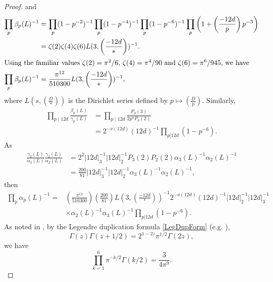 \documentclass[12pt, a4paper]{article}
\begin{document}
\begin{proof}
  and
  \begin{align*}
    \prod_p \beta_p(L)^{-1} & =
    \prod_p (1-p^{-2})^{-1} \prod_p (1 - p^{-4})^{-1} \prod_p (1-p^{-6})^{-1} \prod_p \left( 1 + \left ( \frac{-12d}{p} \right )p^{-3} \right) \\
& = \zeta(2) \zeta(4) \zeta(6) L(3, \left (\frac{-12d}{*} \right ))^{-1}.\\
\intertext{Using the familiar values $\zeta(2) = \pi^2/6$, $\zeta(4) = \pi^4 / 90$ and $\zeta(6) = \pi^6/945$, we have }
    \prod_p \beta_p(L)^{-1} & = \frac{\pi^{12}}{510300} L(3, \left ( \frac{-12d}{*} \right ) )^{-1},
  \end{align*}
  where $L(s, \left( \frac{D}{*} \right) )$ is the Dirichlet series defined by $p \mapsto \left( \frac{D}{p} \right )$. 
  Similarly,
  \begin{align*}
    \prod_{p \mid 12d} \frac{\beta_p(L)}{\gamma_p(L)}
    & = \prod_{p \mid 12d} \frac{P_p(3)}{2 p^a P_p(2)}  \\
    & = 2^{-\nu(12d)} (12d)^{-1} \prod_{p \vert 12d} \left ( 1 - p^{-6} \right ).
  \end{align*}
  As 
  \begin{align*}
    \frac{\gamma_3(L)}{\alpha_3(L)} \frac{\gamma_2(L)}{\alpha_2(L)}
    & = 2^2 \vert 12d \vert^{-1}_3 \vert 12d \vert^{-1}_2 P_3(2) P_2(2) \alpha_3(L)^{-1} \alpha_2(L)^{-1} \\
    & = \frac{200}{81} \vert 12d \vert^{-1}_3 \vert 12d \vert^{-1}_2 \alpha_3(L)^{-1} \alpha_2(L)^{-1}, 
  \end{align*}
  then 
  \begin{align*}
  \prod_p \alpha_p(L)^{-1}
    = & \left ( \frac{\pi^{12}}{510300} \right ) \left ( \frac{200}{81} \right ) L(3, \left( \frac{-12d}{*} \right) )^{-1} 2^{-\nu(12d)} (12d)^{-1}
     \vert 12d \vert^{-1}_2  \vert 12 d \vert^{-1}_3   \\
     & \times \alpha_2(L)^{-1} \alpha_3(L)^{-1} \prod_{p \vert 12 d} \left (1-p^{-6} \right ).
  \end{align*}
     As noted in \cite{HMvolapps}, by the Legendre duplication formula \eqref{LegDupForm} (e.g. \cite[p.73]{Davenport}), 
  \begin{equation}\label{LegDupForm}
    \Gamma(z) \Gamma(z + 1/2) = 2^{1-2z} \pi^{1/2} \Gamma(2z),
  \end{equation}
  we have 
  \begin{equation}\label{PiGammaProd}
    \prod_{k=1}^6 \pi^{-k/2}\Gamma(k/2) = \frac{3 }{4 \pi^9}.
  \end{equation}

\end{proof}
\end{document}
